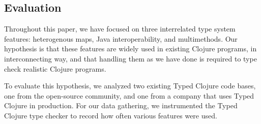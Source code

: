 %
%
%

\subsection{Evaluation}
\label{sec:casestudy}

Throughout this paper, we have focused on three interrelated type
system features: heterogenous maps, Java interoperability, and
multimethods. Our hypothesis is that these features are widely used in
existing Clojure programs, in interconnecting way, and that handling
them as we have done is required to type check realistic Clojure
programs.

To evaluate this hypothesis, we analyzed two existing Typed Clojure
code bases, one from the open-source community, and one from a company
that uses Typed Clojure in production. For our data gathering, we
instrumented the Typed Clojure type checker to record how often
various features were used. 

